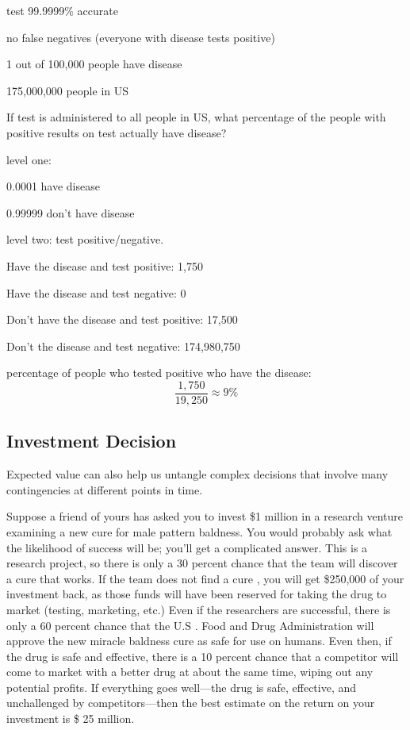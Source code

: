 \documentclass[landscape]{exam}
\begin{document}
  \begin{itemize*}
    \item test 99.9999\% accurate
    \item no false negatives (everyone with disease tests positive)
    \item 1 out of 100,000 people have disease
    \item 175,000,000 people in US
  \end{itemize*}

  If test is administered to all people in US, what percentage of the people
  with positive results on test actually have disease?


  \begin{solution}
    level one:
    \begin{itemize*}
      \item 0.0001 have disease
      \item 0.99999 don't have disease
    \end{itemize*}

    level two: test positive/negative. 
    \begin{itemize*}
      \item Have the disease and test positive: 1,750
      \item Have the disease and test negative: 0
      \item Don't have the disease and test positive: 17,500
      \item Don't the disease and test negative: 174,980,750
    \end{itemize*}

    percentage of people who tested positive who have the disease:
    \[
      \frac{1,750}{19,250} \approx 9\%
    \]

  \end{solution}

  \subsection{Investment Decision}
  Expected value can also help us untangle complex decisions that involve many
  contingencies at different points in time. 

  Suppose a friend of yours has asked you to invest \$1 million in a research
  venture examining a new cure for male pattern baldness. You would probably ask
  what the likelihood of success will be; you’ll get a complicated answer. This
  is a research project, so there is only a 30 percent chance that the team will
  discover a cure that works. If the team does not find a cure , you will get
  \$250,000 of your investment back, as those funds will have been reserved for
  taking the drug to market (testing, marketing, etc.) Even if the researchers
  are successful, there is only a 60 percent chance that the U.S . Food and Drug
  Administration will approve the new miracle baldness cure as safe for use on
  humans. Even then, if the drug is safe and effective, there is a 10 percent
  chance that a competitor will come to market with a better drug at about the
  same time, wiping out any potential profits. If everything goes well---the drug
  is safe, effective, and unchallenged by competitors---then the best estimate
  on the return on your investment is \$ 25 million. 
\end{document}
